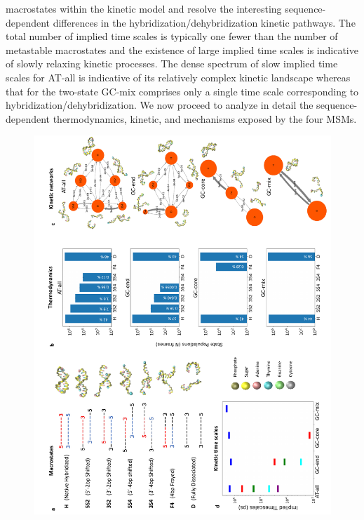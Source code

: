 \documentclass[journal=jpcbfk,manuscript=article]{achemso}
\begin{document}
macrostates within the kinetic model and resolve the interesting sequence-dependent differences in the hybridization/dehybridization kinetic pathways. The total number of implied time scales is typically one fewer than the number of metastable macrostates and the existence of large implied time scales is indicative of slowly relaxing kinetic processes. The dense spectrum of slow implied time scales for AT-all is indicative of its relatively complex kinetic landscape whereas that for the two-state GC-mix comprises only a single time scale corresponding to hybridization/dehybridization. We now proceed to analyze in detail the sequence-dependent thermodynamics, kinetic, and mechanisms exposed by the four MSMs.

\begin{figure}[ht!]
	\begin{center}
        \includegraphics[width=1.0\textwidth]{Fig2.pdf}
	\end{center}
\end{figure}
\end{document}
